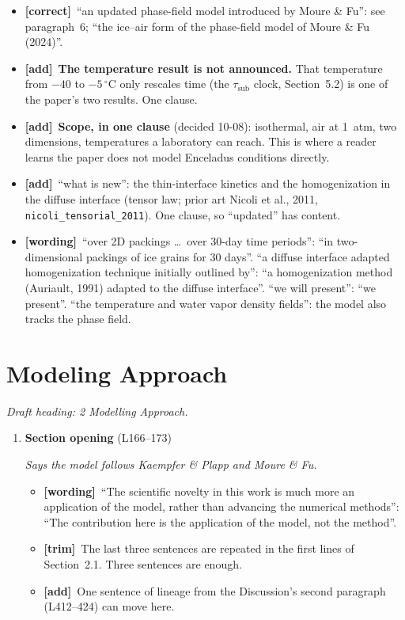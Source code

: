 \documentclass[11pt]{article}
\newcommand{\Pg}[3]{\item \textbf{#1} {\small(#2)}\par\textit{#3}}
\newcommand{\tC}{\textcolor{miss}{\textbf{[correct]}}\ }
\newcommand{\tG}{\textcolor{stale}{\textbf{[wording]}}\ }
\newcommand{\tT}{\textcolor{cut}{\textbf{[trim]}}\ }
\newcommand{\tA}{\textcolor{have}{\textbf{[add]}}\ }
\begin{document}
\begin{enumerate}
\begin{itemize}
    sintering model''.
  \item \tC ``an updated phase-field model introduced by Moure \& Fu'':
    see paragraph~6; ``the ice--air form of the phase-field model of Moure
    \& Fu (2024)''.
  \item \tA \textbf{The temperature result is not announced.} That
    temperature from $-40$ to $-5\,^{\circ}$C only rescales time (the
    $\tau_{\mathrm{sub}}$ clock, Section~5.2) is one of the paper's two
    results. One clause.
  \item \tA \textbf{Scope, in one clause} (decided 10-08): isothermal, air
    at 1~atm, two dimensions, temperatures a laboratory can reach. This is
    where a reader learns the paper does not model Enceladus conditions
    directly.
  \item \tA ``what is new'': the thin-interface kinetics and the
    homogenization in the diffuse interface (tensor law; prior art Nicoli
    et al., 2011, \texttt{nicoli\_tensorial\_2011}). One clause, so
    ``updated'' has content.
  \item \tG ``over 2D packings \ldots\ over 30-day time periods'': ``in
    two-dimensional packings of ice grains for 30 days''. ``a diffuse
    interface adapted homogenization technique initially outlined by'':
    ``a homogenization method (Auriault, 1991) adapted to the diffuse
    interface''. ``we will present'': ``we present''. ``the temperature and
    water vapor density fields'': the model also tracks the phase field.
  \end{itemize}
\end{enumerate}

\section{Modeling Approach}
\textit{Draft heading: 2 Modelling Approach.}
\begin{enumerate}
\Pg{Section opening}{L166--173}{Says the model follows Kaempfer \& Plapp and Moure \& Fu.}
  \begin{itemize}
  \item \tG ``The scientific novelty in this work is much more an application
    of the model, rather than advancing the numerical methods'': ``The
    contribution here is the application of the model, not the method''.
  \item \tT The last three sentences are repeated in the first lines of
    Section~2.1. Three sentences are enough.
  \item \tA One sentence of lineage from the Discussion's second paragraph
    (L412--424) can move here.
  \end{itemize}
\end{enumerate}
\end{document}
